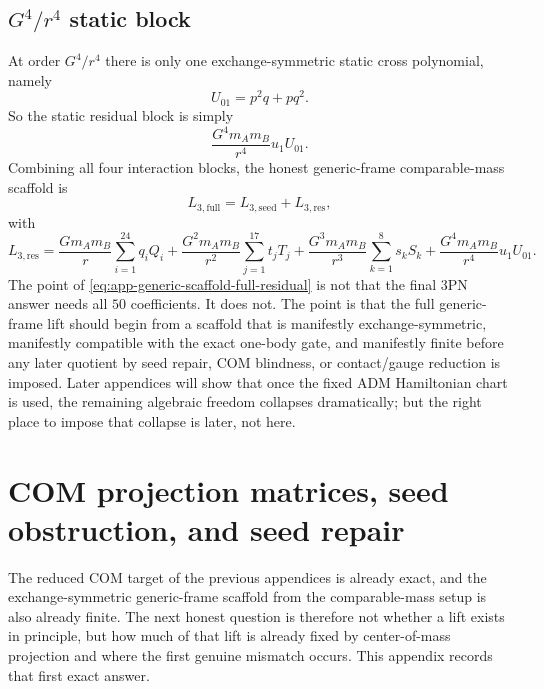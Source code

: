 \documentclass[11pt]{article}
\begin{document}
\subsection{\texorpdfstring{$G^4/r^4$}{G to the 4/r to the 4} static block}
\label{app:generic-scaffold-g4}

At order $G^4/r^4$ there is only one exchange-symmetric static cross polynomial,
 namely
\begin{equation}
U_{01}=p^2q+pq^2.
\label{eq:app-generic-scaffold-U01}
\end{equation}
So the static residual block is simply
\begin{equation}
\frac{G^4m_A m_B}{r^4} u_1 U_{01}.
\label{eq:app-generic-scaffold-g4-residual}
\end{equation}
Combining all four interaction blocks, the honest generic-frame comparable-mass
 scaffold is
\begin{equation}
L_{3,\mathrm{full}}=L_{3,\mathrm{seed}}+L_{3,\mathrm{res}},
\label{eq:app-generic-scaffold-full-split}
\end{equation}
with
\begin{equation}
L_{3,\mathrm{res}}
=
\frac{Gm_A m_B}{r}\sum_{i=1}^{24} q_i Q_i
+\frac{G^2m_A m_B}{r^2}\sum_{j=1}^{17} t_j T_j
+\frac{G^3m_A m_B}{r^3}\sum_{k=1}^{8} s_k S_k
+\frac{G^4m_A m_B}{r^4} u_1 U_{01}.
\label{eq:app-generic-scaffold-full-residual}
\end{equation}
The point of \eqref{eq:app-generic-scaffold-full-residual} is not that the final
 $3$PN answer needs all $50$ coefficients.  It does not.  The point is that the
 full generic-frame lift should begin from a scaffold that is manifestly
 exchange-symmetric, manifestly compatible with the exact one-body gate, and
 manifestly finite before any later quotient by seed repair, COM blindness, or
 contact/gauge reduction is imposed.  Later appendices will show that once the
 fixed ADM Hamiltonian chart is used, the remaining algebraic freedom collapses
 dramatically; but the right place to impose that collapse is later, not here.


\section{COM projection matrices, seed obstruction, and seed repair}
\label{app:com-projection-seed-repair}

The reduced COM target of the previous appendices is already exact, and the
exchange-symmetric generic-frame scaffold from the comparable-mass setup is also
already finite.  The next honest question is therefore not whether a lift
exists in principle, but how much of that lift is already fixed by center-of-mass
projection and where the first genuine mismatch occurs.  This appendix records
that first exact answer.
\end{document}
